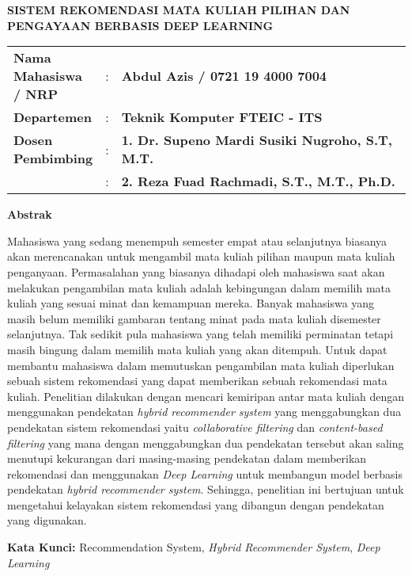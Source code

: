 {
\begin{center}
    \uppercase{\textbf{\large Sistem rekomendasi Mata Kuliah Pilihan dan Pengayaan berbasis Deep Learning}}
\end{center}

\vspace*{6 mm}
\begin{adjustwidth}{}{}
    \begin{tabular}{lcp{1\linewidth}}
        \noindent\textbf{Nama Mahasiswa / NRP} & : & \textbf{Abdul Azis / 0721 19 4000 7004}                \\
        \noindent\textbf{Departemen}           & : & \textbf{Teknik Komputer FTEIC - ITS}                   \\
        \noindent\textbf{Dosen Pembimbing}     & : & \textbf{1. Dr. Supeno Mardi Susiki Nugroho, S.T, M.T.} \\
                                               & : & \textbf{2. Reza Fuad Rachmadi, S.T., M.T., Ph.D.}      \\
    \end{tabular}
\end{adjustwidth}

\vspace{6 mm}
\noindent
\textbf{Abstrak}
\vspace{3 mm}

Mahasiswa yang sedang menempuh semester empat atau selanjutnya biasanya akan merencanakan untuk mengambil mata kuliah pilihan maupun mata kuliah penganyaan.
Permasalahan yang biasanya dihadapi oleh mahasiswa saat akan melakukan pengambilan mata kuliah adalah kebingungan dalam memilih mata kuliah yang sesuai minat dan kemampuan
mereka. Banyak mahasiswa yang masih belum memiliki gambaran tentang minat pada mata kuliah disemester selanjutnya. Tak sedikit pula mahasiswa yang telah memiliki
perminatan tetapi masih bingung dalam memilih mata kuliah yang akan ditempuh. Untuk dapat membantu mahasiswa dalam memutuskan pengambilan mata kuliah diperlukan sebuah
sistem rekomendasi yang dapat memberikan sebuah rekomendasi mata kuliah. Penelitian dilakukan dengan mencari kemiripan antar mata kuliah dengan menggunakan pendekatan \emph{hybrid recommender system} yang menggabungkan dua
pendekatan sistem rekomendasi yaitu \emph{collaborative filtering} dan \emph{content-based filtering} yang mana dengan menggabungkan dua pendekatan tersebut akan saling menutupi
kekurangan dari masing-masing pendekatan dalam memberikan rekomendasi dan menggunakan \emph{Deep Learning} untuk membangun model berbasis pendekatan \emph{hybrid recommender system}. Sehingga, penelitian ini
bertujuan untuk mengetahui kelayakan sistem rekomendasi yang dibangun dengan pendekatan yang digunakan.

\vspace{6 mm}
\noindent
\textbf{Kata Kunci: }Recommendation System, \emph{Hybrid Recommender System}, \emph{Deep Learning}
}